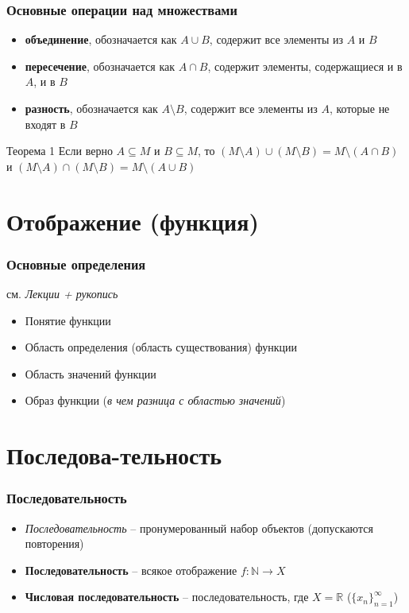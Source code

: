 \documentclass[10pt]{beamer}
\numberwithin{equation}{subsection}
\begin{document}
    \begin{frame}[fragile]
        \frametitle{Основные операции над множествами}
        \begin{itemize}
            \item \textbf{объединение}, обозначается как $A \cup B$, содержит все элементы из $A$ и $B$ 
            \item \textbf{пересечение}, обозначается как $A \cap B$, содержит элементы, содержащиеся и в $A$, и в $B$
            \item \textbf{разность}, обозначается как $A \setminus B$, содержит все элементы из $A$, которые не входят в $B$
        \end{itemize}
        \begin{block}{Теорема 1}
            \label{th:th1}
            Если верно $A \subseteq M$ и $B \subseteq M$, то $(M \setminus A) \cup (M \setminus B) = M \setminus (A \cap B)$ и $(M \setminus A) \cap (M \setminus B) = M \setminus (A \cup B)$
        \end{block}
    \end{frame}

    \section{Отображение (функция)}
    \begin{frame}
        \frametitle{Основные определения}
        см. \textit{Лекции + рукопись}
        \begin{itemize}
            \item Понятие функции
            \item Область определения (область существования) функции
            \item Область значений функции
            \item Образ функции (\textit{в чем разница с областью значений})
        \end{itemize}
    \end{frame}

    \section{Последова-тельность}
    \begin{frame}
        \frametitle{Последовательность}
        \begin{itemize}
            \item \textit{Последовательность} -- пронумерованный набор объектов (допускаются повторения)
            \item \textbf{Последовательность} -- всякое отображение $f: \mathbb{N} \rightarrow X$
            \item \textbf{Числовая последовательность} -- последовательность, где $X = \mathbb{R}$ ($\{x_n\}_{n=1}^\infty$)
        \end{itemize}
    \end{frame}
\end{document}
